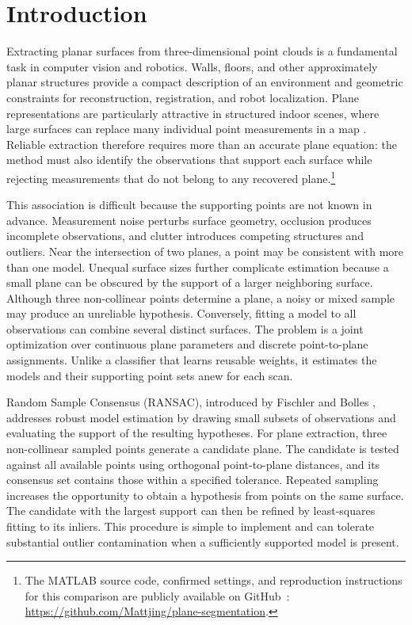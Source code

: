 \section{Introduction}\label{introduction}

Extracting planar surfaces from three-dimensional point clouds is a fundamental task in computer vision and robotics. Walls, floors, and other approximately planar structures provide a compact description of an environment and geometric constraints for reconstruction, registration, and robot localization. Plane representations are particularly attractive in structured indoor scenes, where large surfaces can replace many individual point measurements in a map \cite{kaess2015planes,schaefer2019planes}. Reliable extraction therefore requires more than an accurate plane equation: the method must also identify the observations that support each surface while rejecting measurements that do not belong to any recovered plane.\footnote{The MATLAB source code, confirmed settings, and reproduction instructions for this comparison are publicly available on GitHub~\cite{jing2026planes}: \url{https://github.com/Mattjing/plane-segmentation}.}

This association is difficult because the supporting points are not known in advance. Measurement noise perturbs surface geometry, occlusion produces incomplete observations, and clutter introduces competing structures and outliers. Near the intersection of two planes, a point may be consistent with more than one model. Unequal surface sizes further complicate estimation because a small plane can be obscured by the support of a larger neighboring surface. Although three non-collinear points determine a plane, a noisy or mixed sample may produce an unreliable hypothesis. Conversely, fitting a model to all observations can combine several distinct surfaces. The problem is a joint optimization over continuous plane parameters and discrete point-to-plane assignments. Unlike a classifier that learns reusable weights, it estimates the models and their supporting point sets anew for each scan.

Random Sample Consensus (RANSAC), introduced by Fischler and Bolles \cite{fischler1981ransac}, addresses robust model estimation by drawing small subsets of observations and evaluating the support of the resulting hypotheses. For plane extraction, three non-collinear sampled points generate a candidate plane. The candidate is tested against all available points using orthogonal point-to-plane distances, and its consensus set contains those within a specified tolerance. Repeated sampling increases the opportunity to obtain a hypothesis from points on the same surface. The candidate with the largest support can then be refined by least-squares fitting to its inliers. This procedure is simple to implement and can tolerate substantial outlier contamination when a sufficiently supported model is present.

